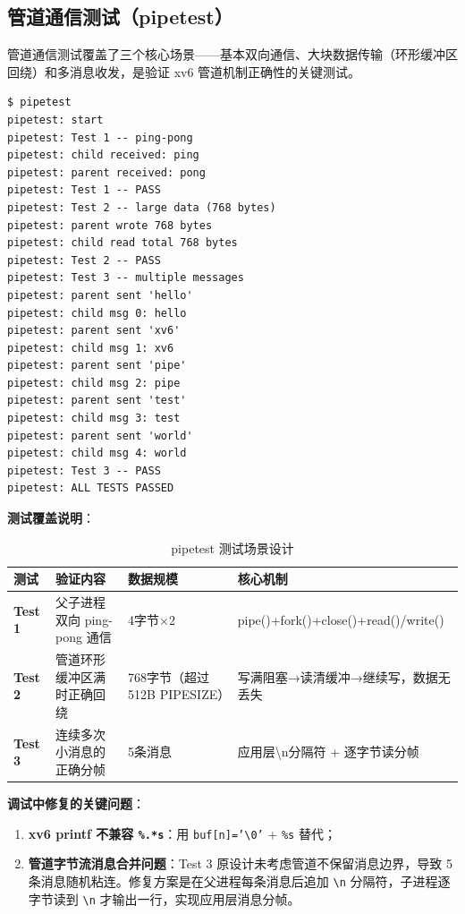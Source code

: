 \documentclass[12pt,a4paper]{ctexart}
\begin{document}
\subsection{管道通信测试（pipetest）}

管道通信测试覆盖了三个核心场景——基本双向通信、大块数据传输（环形缓冲区回绕）和多消息收发，是验证 xv6 管道机制正确性的关键测试。

\begin{lstlisting}[caption={pipetest 完整运行结果}]
$ pipetest
pipetest: start
pipetest: Test 1 -- ping-pong
pipetest: child received: ping
pipetest: parent received: pong
pipetest: Test 1 -- PASS
pipetest: Test 2 -- large data (768 bytes)
pipetest: parent wrote 768 bytes
pipetest: child read total 768 bytes
pipetest: Test 2 -- PASS
pipetest: Test 3 -- multiple messages
pipetest: parent sent 'hello'
pipetest: child msg 0: hello
pipetest: parent sent 'xv6'
pipetest: child msg 1: xv6
pipetest: parent sent 'pipe'
pipetest: child msg 2: pipe
pipetest: parent sent 'test'
pipetest: child msg 3: test
pipetest: parent sent 'world'
pipetest: child msg 4: world
pipetest: Test 3 -- PASS
pipetest: ALL TESTS PASSED
\end{lstlisting}

\textbf{测试覆盖说明}：

\begin{table}[H]
\centering
\caption{pipetest 测试场景设计}
\begin{tabular}{>{\bfseries}p{2cm}p{4cm}p{3.5cm}p{3.5cm}}
\toprule
\textbf{测试} & \textbf{验证内容} & \textbf{数据规模} & \textbf{核心机制} \\
\midrule
Test 1 & 父子进程双向 ping-pong 通信 & 4字节×2 & pipe()+fork()+close()+read()/write() \\
Test 2 & 管道环形缓冲区满时正确回绕 & 768字节（超过512B PIPESIZE） & 写满阻塞→读清缓冲→继续写，数据无丢失 \\
Test 3 & 连续多次小消息的正确分帧 & 5条消息 & 应用层\textbackslash n分隔符 + 逐字节读分帧 \\
\bottomrule
\end{tabular}
\end{table}

\textbf{调试中修复的关键问题}：
\begin{enumerate}
  \item \textbf{xv6 printf 不兼容 \texttt{\%.*s}}：用 \texttt{buf[n]='\textbackslash0'} + \texttt{\%s} 替代；
  \item \textbf{管道字节流消息合并问题}：Test 3 原设计未考虑管道不保留消息边界，导致 5 条消息随机粘连。修复方案是在父进程每条消息后追加 \texttt{\textbackslash n} 分隔符，子进程逐字节读到 \texttt{\textbackslash n} 才输出一行，实现应用层消息分帧。
\end{enumerate}
\end{document}

